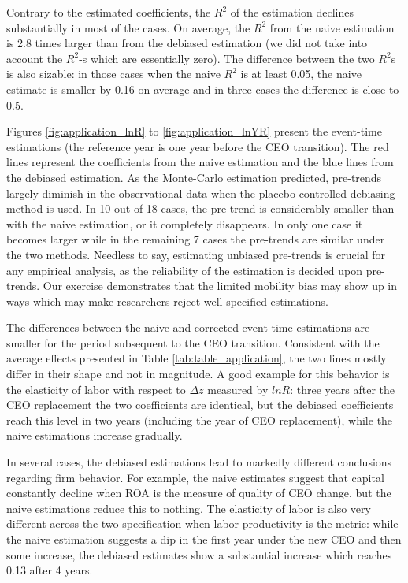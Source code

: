 \documentclass[11pt,a4paper]{article}
\begin{document}
Contrary to the estimated coefficients, the $R^2$ of the estimation declines substantially in most of the cases. On average, the $R^2$ from the naive estimation is 2.8 times larger than from the debiased estimation (we did not take into account the $R^2$-s which are essentially zero). The difference between the two $R^2$s is also sizable: in those cases when the naive $R^2$ is at least 0.05, the naive estimate is smaller by 0.16 on average and in three cases the difference is close to 0.5.

Figures \ref{fig:application_lnR} to \ref{fig:application_lnYR} present the event-time estimations (the reference year is one year before the CEO transition). The red lines represent the coefficients from the naive estimation and the blue lines from the debiased estimation. As the Monte-Carlo estimation predicted, pre-trends largely diminish in the observational data when the placebo-controlled debiasing method is used. In 10 out of 18 cases, the pre-trend is considerably smaller than with the naive estimation, or it completely disappears. In only one case it becomes larger while in the remaining 7 cases the pre-trends are similar under the two methods. Needless to say, estimating unbiased pre-trends is crucial for any empirical analysis, as the reliability of the estimation is decided upon pre-trends. Our exercise demonstrates that the limited mobility bias may show up in ways which may make researchers reject well specified estimations.

The differences between the naive and corrected event-time estimations are smaller for the period subsequent to the CEO transition. Consistent with the average effects presented in Table \ref{tab:table_application}, the two lines mostly differ in their shape and not in magnitude. A good example for this behavior is the elasticity of labor with respect to $\Delta z$ measured by $lnR$: three years after the CEO replacement the two coefficients are identical, but the debiased coefficients reach this level in two years (including the year of CEO replacement), while the naive estimations increase gradually. 

In several cases, the debiased estimations lead to markedly different conclusions regarding firm behavior. For example, the naive estimates suggest that capital constantly decline when ROA is the measure of quality of CEO change, but the naive estimations reduce this to nothing. The elasticity of labor is also very different across the two specification when labor productivity is the metric: while the naive estimation suggests a dip in the first year under the new CEO and then some increase, the debiased estimates show a substantial increase which reaches 0.13 after 4 years.
\end{document}
